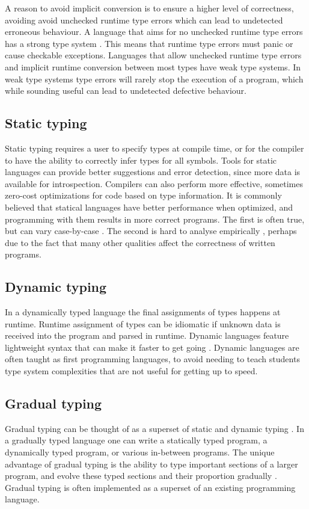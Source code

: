 A reason to avoid implicit conversion is to ensure a higher level of correctness, avoiding avoid unchecked runtime type errors which can lead to undetected erroneous behaviour. A language that aims for no unchecked runtime type errors has a strong type system \cite{cardelli_typeful_1989}. This means that runtime type errors must panic or cause checkable exceptions. Languages that allow unchecked runtime type errors and implicit runtime conversion between most types have weak type systems. In weak type systems type errors will rarely stop the execution of a program, which while sounding useful can lead to undetected defective behaviour.

\subsection{Static typing}
Static typing requires a user to specify types at compile time, or for the compiler to have the ability to correctly infer types for all symbols. Tools for static languages can provide better suggestions and error detection, since more data is available for introspection. Compilers can also perform more effective, sometimes zero-cost optimizations for code based on type information. It is commonly believed that statical languages have better performance when optimized, and programming with them results in more correct programs. The first is often true, but can vary case-by-case \cite{nanz_comparative_2015}. The second is hard to analyse empirically \cite{codequality_reproudction_2019}, perhaps due to the fact that many other qualities affect the correctness of written programs. 

\subsection{Dynamic typing}
In a dynamically typed language the final assignments of types happens at runtime. Runtime assignment of types can be idiomatic if unknown data is received into the program and parsed in runtime. Dynamic languages feature lightweight syntax that can make it faster to get going \cite{di_grazia_evolution_2022}. Dynamic languages are often taught as first programming languages, to avoid needing to teach students type system complexities that are not useful for getting up to speed.


\subsection{Gradual typing}
Gradual typing can be thought of as a superset of static and dynamic typing \cite{siek_refined_gradual_2015}. In a gradually typed language one can write a statically typed program, a dynamically typed program, or various in-between programs. The unique advantage of gradual typing is the ability to type important sections of a larger program, and evolve these typed sections and their proportion gradually \cite{siek_refined_gradual_2015}. Gradual typing is often implemented as a superset of an existing programming language.

